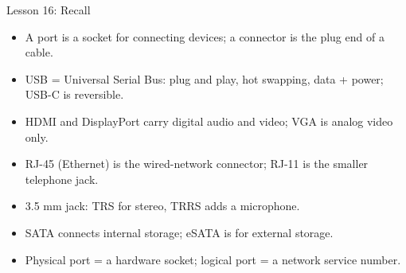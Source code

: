 \documentclass[aspectratio=169]{beamer}
\begin{document}
\begin{frame}{Lesson 16: Recall}
  \begin{itemize}
    \item A port is a socket for connecting devices; a connector is the plug
      end of a cable.
    \item USB = Universal Serial Bus: plug and play, hot swapping, data +
      power; USB-C is reversible.
    \item HDMI and DisplayPort carry digital audio and video; VGA is analog
      video only.
    \item RJ-45 (Ethernet) is the wired-network connector; RJ-11 is the
      smaller telephone jack.
    \item 3.5 mm jack: TRS for stereo, TRRS adds a microphone.
    \item SATA connects internal storage; eSATA is for external storage.
    \item Physical port = a hardware socket; logical port = a network service
      number.
  \end{itemize}
\end{frame}
\end{document}
